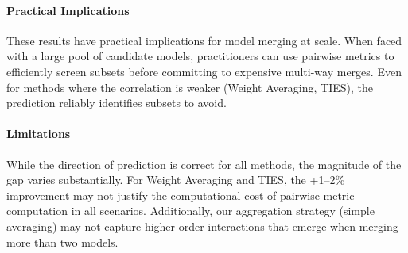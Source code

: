\paragraph{Practical Implications}
These results have practical implications for model merging at scale. When faced with a large pool of candidate models, practitioners can use pairwise metrics to efficiently screen subsets before committing to expensive multi-way merges. Even for methods where the correlation is weaker (Weight Averaging, TIES), the prediction reliably identifies subsets to avoid.

\paragraph{Limitations}
While the direction of prediction is correct for all methods, the magnitude of the gap varies substantially. For Weight Averaging and TIES, the +1--2\% improvement may not justify the computational cost of pairwise metric computation in all scenarios. Additionally, our aggregation strategy (simple averaging) may not capture higher-order interactions that emerge when merging more than two models.
